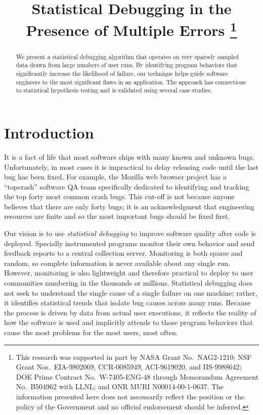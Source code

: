 \documentclass{sig-alternate}
\title{Statistical Debugging in the Presence of Multiple Errors
  \thanks{This research was supported in part by NASA Grant No.\
    NAG2-1210; NSF Grant Nos.\ EIA-9802069, CCR-0085949, ACI-9619020,
    and IIS-9988642; DOE Prime Contract No.\ W-7405-ENG-48 through
    Memorandum Agreement No.\ B504962 with LLNL; and ONR MURI
    N00014-00-1-0637.  The information
    presented here does not necessarily reflect the position or the
    policy of the Government and no official endorsement should be
    inferred.}}
\author{
  \alignauthor Ben Liblit \eecs \\
  \alignauthor Mayur Naik \stan \\
  \alignauthor Alice X.\ Zheng \eecs \\
  \moreauthors
  \global\multiply\auwidth by 3
  \global\divide\auwidth by 2
  \alignauthor Alex Aiken \stan \\
  \alignauthor Michael I.\ Jordan \both
  \moreauthors
  \alignauthor
  \affaddr{\eecs Department of Electrical \\ Engineering and Computer Science} \\
  \affaddr{\stat Department of Statistics} \\
  \affaddr{University of California, Berkeley} \\
  \affaddr{Berkeley, CA 94720-1776}
  \alignauthor
  \affaddr{\stan Computer Science Department} \\
  \affaddr{353 Serra Mall} \\
  \affaddr{Stanford University} \\
  \affaddr{Stanford CA 94305-9025}
}
\newcommand{\termdef}[1]{\textit{#1}}
\begin{document}
\CopyrightYear{2004}
\maketitle

\begin{abstract}
  We present a statistical debugging algorithm that operates on very
  sparsely sampled data drawn from large numbers of user runs.  By
  identifying program behaviors that significantly increase the
  likelihood of failure, our technique helps guide software engineers
  to the most significant flaws in an application.  The approach has
  connections to statistical hypothesis testing and is validated
  using several case studies.
\end{abstract}






\section{Introduction}
\label{sec:introduction}

It is a fact of life that most software ships with many known and
unknown bugs.  Unfortunately, in most cases it is impractical to delay
releasing code until the last bug has been fixed.  For example, the
Mozilla web browser project has a ``topcrash'' software QA team
specifically dedicated to identifying and tracking the top forty most
common crash bugs.  This cut-off is not because anyone believes that
there are only forty bugs; it is an acknowledgment that engineering
resources are finite and so the most important bugs should be fixed
first.

Our vision is to use \termdef{statistical debugging} to improve
software quality after code is deployed.  Specially instrumented
programs monitor their own behavior and send feedback reports to a
central collection server.  Monitoring is both sparse and random, so
complete information is never available about any single run.
However, monitoring is also lightweight and therefore practical to
deploy to user communities numbering in the thousands or millions.
Statistical debugging does not seek to understand the single cause of
a single failure on one machine; rather, it identifies statistical
trends that isolate bug causes across many runs.  Because the process
is driven by data from actual user executions, it reflects the reality
of how the software is used and implicitly attends to those program
behaviors that cause the most problems for the most users, most often.
\end{document}
